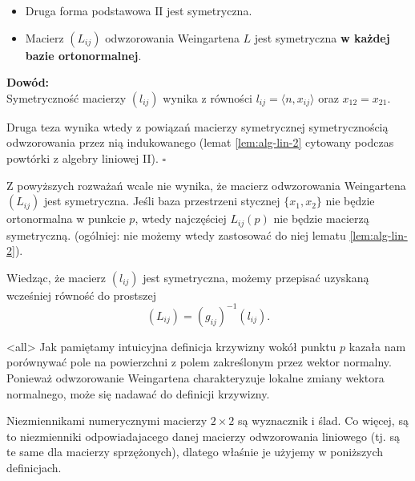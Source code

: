 \begin{frame}

\begin{lemat}
\begin{itemize}
\pause \item Druga forma podstawowa $\text{II}$ jest symetryczna.
\pause \item Macierz $(L_{ij})$ odwzorowania Weingartena $L$ jest symetryczna \textbf{w każdej bazie ortonormalnej}.
\end{itemize}
\end{lemat}
\textcolor{ared}{\textbf{Dowód:}}\\\pause 
Symetryczność macierzy $(l_{ij})$ wynika z równości $l_{ij} =\langle n,x_{ij} \rangle$ oraz $x_{12}=x_{21}$. 

\pause Druga teza wynika wtedy z powiązań macierzy symetrycznej symetrycznością odwzorowania przez nią indukowanego (lemat \ref{lem:alg-lin-2} cytowany podczas powtórki z algebry liniowej II).
\hfill $\square$

\end{frame}
\begin{frame}[<+->]

\begin{uwaga}
Z powyższych rozważań wcale nie wynika, że macierz odwzorowania Weingartena $(L_{ij})$ jest symetryczna. Jeśli baza przestrzeni stycznej $\{x_1, x_2\}$ nie będzie ortonormalna w punkcie $p$, wtedy najczęściej $L_{ij}(p)$ nie będzie macierzą symetryczną. (ogólniej: nie możemy wtedy zastosować do niej lematu \ref{lem:alg-lin-2}).
\end{uwaga}

\begin{uwaga}
Wiedząc, że macierz $(l_{ij})$ jest symetryczna, możemy przepisać uzyskaną wcześniej równość do prostszej 
\[(L_{ij})=(g_{ij})^{-1}(l_{ij}).\]
\end{uwaga}

\end{frame}
\mode<all>{}
Jak pamiętamy intuicyjna definicja krzywizny wokół punktu $p$ kazała nam porównywać pole na powierzchni z polem zakreślonym przez wektor normalny. Ponieważ odwzorowanie Weingartena charakteryzuje lokalne zmiany wektora normalnego, może się nadawać do definicji krzywizny.

Niezmiennikami numerycznymi macierzy $2\times2$ są wyznacznik i ślad. Co więcej, są to niezmienniki odpowiadajacego danej macierzy odwzorowania liniowego (tj. są te same dla macierzy sprzężonych), dlatego właśnie je użyjemy w poniższych definicjach.


